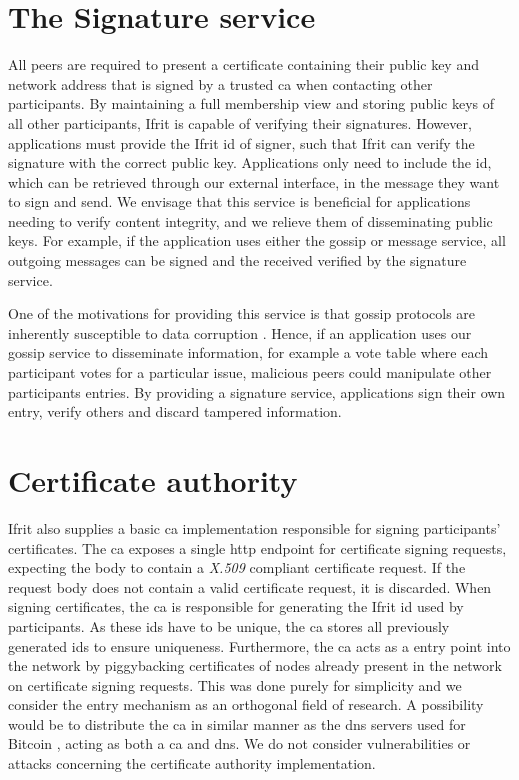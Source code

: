 \documentclass[USenglish]{uit-thesis}
\begin{document}
\section{The Signature service}
All peers are required to present a certificate containing their public key and network address that is signed by a trusted \gls{ca} when contacting other participants.
By maintaining a full membership view and storing public keys of all other participants, Ifrit is capable of verifying their signatures.
However, applications must provide the Ifrit id of signer, such that Ifrit can verify the signature with the correct public key.
Applications only need to include the id, which can be retrieved through our external interface, in the message they want to sign and send.
We envisage that this service is beneficial for applications needing to verify content integrity, and we relieve them of disseminating public keys. 
For example, if the application uses either the gossip or message service, all outgoing messages can be signed and the received verified by the signature service.

One of the motivations for providing this service is that gossip protocols are inherently susceptible to data corruption \cite{gossip_promise}.
Hence, if an application uses our gossip service to disseminate information, for example a vote table where each participant votes for a particular issue, malicious peers could manipulate other participants entries.
By providing a signature service, applications sign their own entry, verify others and discard tampered information.



\section{Certificate authority}
Ifrit also supplies a basic \gls{ca} implementation responsible for signing participants' certificates.
The \gls{ca} exposes a single \gls{http} endpoint for certificate signing requests, expecting the body to contain a \textit{X.509} compliant certificate request.
If the request body does not contain a valid certificate request, it is discarded.
When signing certificates, the \gls{ca} is responsible for generating the Ifrit id used by participants.
As these ids have to be unique, the \gls{ca} stores all previously generated ids to ensure uniqueness.
Furthermore, the \gls{ca} acts as a entry point into the network by piggybacking certificates of nodes already present in the network on certificate signing requests. 
This was done purely for simplicity and we consider the entry mechanism as an orthogonal field of research.  
A possibility would be to distribute the \gls{ca} in similar manner as the \gls{dns} servers used for Bitcoin \cite{propa}, acting as both a \gls{ca} and \gls{dns}. 
We do not consider vulnerabilities or attacks concerning the certificate authority implementation.
\end{document}
